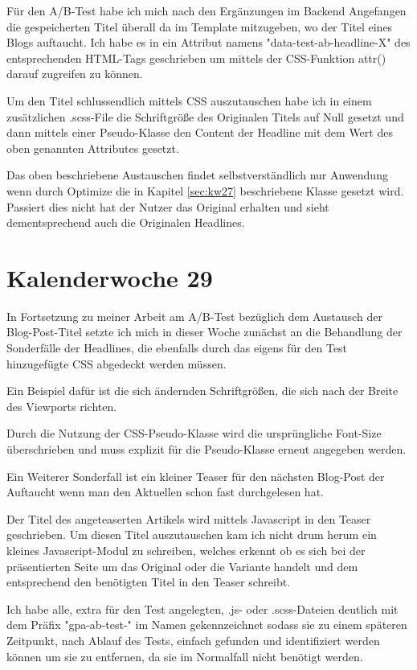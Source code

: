 \documentclass[11pt]{article} %
\begin{document}
Für den A/B-Test habe ich mich nach den Ergänzungen im Backend Angefangen die gespeicherten Titel überall da im Template mitzugeben, wo der Titel eines Blogs auftaucht. Ich habe es in ein Attribut namens "data-test-ab-headline-X" des entsprechenden HTML-Tags geschrieben um mittels der CSS-Funktion attr() darauf zugreifen zu können.

Um den Titel schlussendlich mittels CSS auszutauschen habe ich in einem zusätzlichen .scss-File die Schriftgröße des Originalen Titels auf Null gesetzt und dann mittels einer Pseudo-Klasse den Content der Headline mit dem Wert des oben genannten Attributes gesetzt. 

Das oben beschriebene Austauschen findet selbstverständlich nur Anwendung wenn durch Optimize die in Kapitel \ref{sec:kw27} beschriebene Klasse gesetzt wird. Passiert dies nicht hat der Nutzer das Original erhalten und sieht dementsprechend auch die Originalen Headlines.

\section{Kalenderwoche 29} \label{sec:kw29}

In Fortsetzung zu meiner Arbeit am A/B-Test bezüglich dem Austausch der Blog-Post-Titel setzte ich mich in dieser Woche zunächst an die Behandlung der Sonderfälle der Headlines, die ebenfalls durch das eigens für den Test hinzugefügte CSS abgedeckt werden müssen.

Ein Beispiel dafür ist die sich ändernden Schriftgrößen, die sich nach der Breite des Viewports richten.

Durch die Nutzung der CSS-Pseudo-Klasse wird die ursprüngliche Font-Size überschrieben und muss explizit für die Pseudo-Klasse erneut angegeben werden.

Ein Weiterer Sonderfall ist ein kleiner Teaser für den nächsten Blog-Post der Auftaucht wenn man den Aktuellen schon fast durchgelesen hat.

Der Titel des angeteaserten Artikels wird mittels Javascript in den Teaser geschrieben. Um diesen Titel auszutauschen kam ich nicht drum herum ein kleines Javascript-Modul zu schreiben, welches erkennt ob es sich bei der präsentierten Seite um das Original oder die Variante handelt und dem entsprechend den benötigten Titel in den Teaser schreibt.

Ich habe alle, extra für den Test angelegten, .js- oder .scss-Dateien deutlich mit dem Präfix "gpa-ab-test-" im Namen gekennzeichnet sodass sie zu einem späteren Zeitpunkt, nach Ablauf des Tests, einfach gefunden und identifiziert werden können um sie zu entfernen, da sie im Normalfall nicht benötigt werden.
\end{document}
